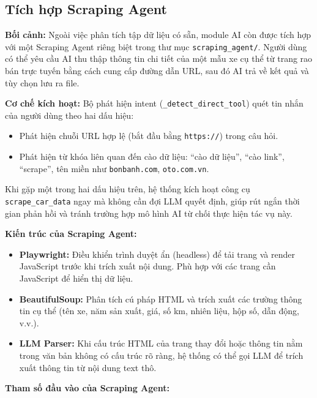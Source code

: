 \subsection{Tích hợp Scraping Agent}
\label{subsec:scraping_agent}

\noindent\textbf{Bối cảnh:}
Ngoài việc phân tích tập dữ liệu có sẵn, module AI còn được tích hợp với một Scraping Agent riêng biệt trong thư mục \texttt{scraping\_agent/}. Người dùng có thể yêu cầu AI thu thập thông tin chi tiết của một mẫu xe cụ thể từ trang rao bán trực tuyến bằng cách cung cấp đường dẫn URL, sau đó AI trả về kết quả và tùy chọn lưu ra file.

\noindent\textbf{Cơ chế kích hoạt:}
Bộ phát hiện intent (\texttt{\_detect\_direct\_tool}) quét tin nhắn của người dùng theo hai dấu hiệu:
\begin{itemize}
    \item Phát hiện chuỗi URL hợp lệ (bắt đầu bằng \texttt{https://}) trong câu hỏi.
    \item Phát hiện từ khóa liên quan đến cào dữ liệu: ``cào dữ liệu'', ``cào link'', ``scrape'', tên miền như \texttt{bonbanh.com}, \texttt{oto.com.vn}.
\end{itemize}
Khi gặp một trong hai dấu hiệu trên, hệ thống kích hoạt công cụ \texttt{scrape\_car\_data} ngay mà không cần đợi LLM quyết định, giúp rút ngắn thời gian phản hồi và tránh trường hợp mô hình AI từ chối thực hiện tác vụ này.

\noindent\textbf{Kiến trúc của Scraping Agent:}
\begin{itemize}
    \item \textbf{Playwright:} Điều khiển trình duyệt ẩn (headless) để tải trang và render JavaScript trước khi trích xuất nội dung. Phù hợp với các trang cần JavaScript để hiển thị dữ liệu.
    \item \textbf{BeautifulSoup:} Phân tích cú pháp HTML và trích xuất các trường thông tin cụ thể (tên xe, năm sản xuất, giá, số km, nhiên liệu, hộp số, dẫn động, v.v.).
    \item \textbf{LLM Parser:} Khi cấu trúc HTML của trang thay đổi hoặc thông tin nằm trong văn bản không có cấu trúc rõ ràng, hệ thống có thể gọi LLM để trích xuất thông tin từ nội dung text thô.
\end{itemize}

\noindent\textbf{Tham số đầu vào của Scraping Agent:}

